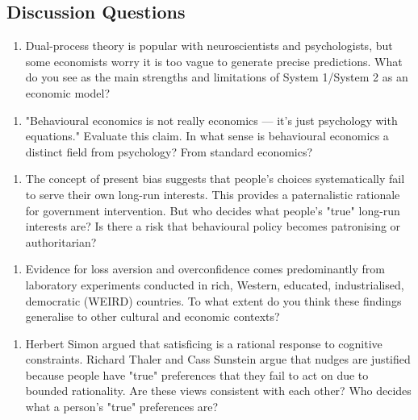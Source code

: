 \documentclass[12pt, letterpaper]{article}
\begin{document}
\subsection{Discussion Questions}


\begin{enumerate}
\item Dual-process theory is popular with neuroscientists and psychologists, but some economists worry it is too vague to generate precise predictions. What do you see as the main strengths and limitations of System 1/System 2 as an economic model?
\end{enumerate}

\begin{enumerate}
\item "Behavioural economics is not really economics --- it's just psychology with equations." Evaluate this claim. In what sense is behavioural economics a distinct field from psychology? From standard economics?
\end{enumerate}

\begin{enumerate}
\item The concept of present bias suggests that people's choices systematically fail to serve their own long-run interests. This provides a paternalistic rationale for government intervention. But who decides what people's "true" long-run interests are? Is there a risk that behavioural policy becomes patronising or authoritarian?
\end{enumerate}

\begin{enumerate}
\item Evidence for loss aversion and overconfidence comes predominantly from laboratory experiments conducted in rich, Western, educated, industrialised, democratic (WEIRD) countries. To what extent do you think these findings generalise to other cultural and economic contexts?
\end{enumerate}

\begin{enumerate}
\item Herbert Simon argued that satisficing is a rational response to cognitive constraints. Richard Thaler and Cass Sunstein argue that nudges are justified because people have "true" preferences that they fail to act on due to bounded rationality. Are these views consistent with each other? Who decides what a person's "true" preferences are?
\end{enumerate}
\end{document}
